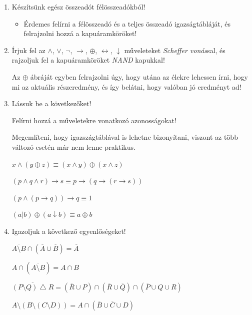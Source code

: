 \documentclass[a4paper]{article}
\newenvironment{solution}
{\color{RoyalBlue}}{\bigskip}
\begin{document}
\begin{enumerate}

\item

Készítsünk egész összeadót félösszeadókból!

\begin{solution}
\begin{itemize}
\item Érdemes felírni a félösszeadó és a teljes összeadó igazságtábláját, és felrajzolni hozzá a kapuáramköröket!
\end{itemize}
\end{solution}

\item

Írjuk fel az $\wedge$, $\vee$, $\neg$, $\rightarrow$, $\oplus$, $\leftrightarrow$, $\downarrow$ műveleteket \textit{Scheffer vonás}sal, és rajzoljuk fel a kapuáramköröket \textit{NAND} kapukkal!

\begin{solution}
Az $\oplus$ ábráját egyben felrajzolni úgy, hogy utána az élekre lehessen írni, hogy mi az aktuális részeredmény, és így belátni, hogy valóban jó eredményt ad!
\end{solution}

\item

Lássuk be a következőket!

\begin{solution}
Felírni hozzá a műveletekre vonatkozó azonosságokat!

Megemlíteni, hogy igazszágtáblával is lehetne bizonyítani, viszont az több változó esetén már nem lenne praktikus.
\end{solution}

$x \wedge (y \oplus z) \equiv (x \wedge y) \oplus (x \wedge z)$

$(p \wedge q \wedge r) \rightarrow s \equiv p \rightarrow (q \rightarrow (r \rightarrow s))$

$(p \wedge (p \rightarrow q)) \rightarrow q \equiv 1$

$(a | b) \oplus (a \downarrow b) \equiv a \oplus b$

\item

Igazoljuk a következő egyenlőségeket!

$\overline{A \setminus B} \cap (\overline{A} \cup \overline{B}) = \overline{A}$

$A \cap (\overline{A \setminus B}) = A \cap B$

$\overline{(P \setminus Q) \bigtriangleup R} =
(\overline{R} \cup P) \cap (\overline{R} \cup \overline{Q}) \cap (\overline{P} \cup Q \cup R)$

$A \setminus (B \setminus (C \setminus D)) =
A \cap (\overline{B} \cup \overline{C} \cup D)$

\end{enumerate}
\end{document}
